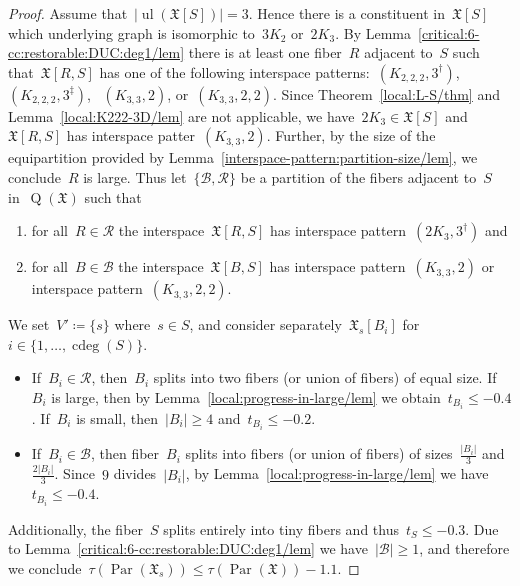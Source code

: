 \documentclass[english,a4paper]{article}
\theoremstyle{plain}
\theoremstyle{definition}
\newcommand{\abs}[1]{| #1 |}
\newcommand{\coherentConfig}{\ensuremath{\mathfrak{X}}}
\newcommand{\interspace}[2]{\ensuremath{\coherentConfig[#1,#2]}}
\newcommand{\inducedCC}[1]{\ensuremath{\coherentConfig[#1]}}
\DeclareMathOperator*{\ul}{ul}
\DeclareMathOperator*{\Quotient}{Q}
\newcommand{\quotientGraph}[1]{\ensuremath{\Quotient(#1)}}
\DeclareMathOperator{\ColorDeg}{cdeg}
\newcommand{\colorDeg}[1]{\ensuremath{\ColorDeg\left(#1\right)}}
\DeclareMathOperator{\parameters}{Par}
\newcommand{\ipsixTriangle}               {\ensuremath{(\disjointCliques{2}{3},3^\dag)}}
\newcommand{\ipsixTriangleComplement}     {\ensuremath{(\clique{3,3},2)}}
\newcommand{\ipsixTriangleComplementTwice}{\ensuremath{(\clique{3,3},2,2)}}
\newcommand{\ipsixMatchingComplement} {\ensuremath{(\clique{2,2,2},3^\dag)}}
\newcommand{\ipsixMatchingComplementD}{\ensuremath{(\clique{2,2,2},3^\ddag)}}
\newcommand{\clique}[1]{\ensuremath{K_{#1}}}
\newcommand{\disjointCliques}[2]{\ensuremath{#1 \clique{#2}}}
\begin{document}
\begin{proof}
    Assume that~$\abs{\ul(\inducedCC{S})} = 3$.
    Hence there is a constituent in~$\inducedCC{S}$ which underlying graph is isomorphic to~$\disjointCliques{3}{2}$ or~$\disjointCliques{2}{3}$.
    By Lemma~\ref{critical:6-cc:restorable:DUC:deg1/lem} there is at least one fiber~$R$ adjacent to~$S$ such that~$\interspace{R}{S}$ has one of the following interspace patterns:~$\ipsixMatchingComplement$,~$\ipsixMatchingComplementD$, ~$\ipsixTriangleComplement$, or~$\ipsixTriangleComplementTwice$.
    Since Theorem~\ref{local:L-S/thm} and Lemma~\ref{local:K222-3D/lem} are not applicable, we have~$\disjointCliques{2}{3} \in \inducedCC{S}$ and~$\interspace{R}{S}$ has interspace patter~$\ipsixTriangleComplement$.
    Further, by the size of the equipartition provided by Lemma~\ref{interspace-pattern:partition-size/lem}, we conclude~$R$ is large.
    Thus let~$\{\mathcal{B},\mathcal{R}\}$ be a partition of the fibers adjacent to~$S$ in~$\quotientGraph{\coherentConfig}$ such that
    \begin{enumerate}
        \item for all~$R \in \mathcal{R}$ the interspace~$\interspace{R}{S}$ has interspace pattern~$\ipsixTriangle$ and
        \item for all~$B \in \mathcal{B}$ the interspace~$\interspace{B}{S}$ has interspace pattern~$\ipsixTriangleComplement$ or interspace pattern~$\ipsixTriangleComplementTwice$.
    \end{enumerate}
    We set~$V' \coloneqq \{s\}$ where~$s \in S$, and consider separately~$\coherentConfig_s[B_i]$ for~$i \in \{1,\dots,\colorDeg{S}\}$.
    \begin{itemize}
        \item
        If~$B_i \in \mathcal{R}$, then~$B_i$ splits into two fibers (or union of fibers) of equal size.
        If~$B_i$ is large, then by Lemma~\ref{local:progress-in-large/lem} we obtain~$t_{B_i} \leq -0.4$.
        If~$B_i$ is small, then~$|B_i| \geq 4$ and~$t_{B_i} \leq -0.2$.
        \item
        If~$B_i \in \mathcal{B}$, then fiber~$B_i$ splits into fibers (or union of fibers) of sizes~$\frac{\abs{B_i}}{3}$ and~$\frac{2\abs{B_i}}{3}$.
        Since~$9$ divides~$|B_i|$, by Lemma~\ref{local:progress-in-large/lem} we have~$t_{B_i} \leq -0.4$.
    \end{itemize}
    Additionally, the fiber~$S$ splits entirely into tiny fibers and thus~$t_S \leq -0.3$.
    Due to Lemma~\ref{critical:6-cc:restorable:DUC:deg1/lem} we have~$\abs{\mathcal{B}} \geq 1$, and therefore we conclude~$\tau(\parameters(\coherentConfig_s)) \leq \tau(\parameters(\coherentConfig))- 1.1$.
\end{proof}
\end{document}
